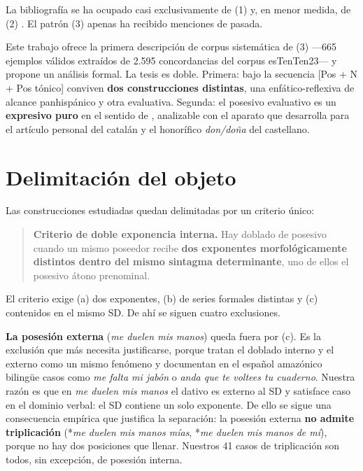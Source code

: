 \documentclass[12pt,a4paper]{article}
\begin{document}
La bibliografía se ha ocupado casi exclusivamente de (1) y, en menor medida, de (2) \parencite{companycompany1994,companycompany1995,companycompany2001,companycompanyhuertaflores2017,granda1997,picallorigau1999,godenzzi2010,huertaflores2009,eguren2016,eguren2017b,rodriguezmondonedofafulas2016,rae2009}. El patrón (3) apenas ha recibido menciones de pasada.

Este trabajo ofrece la primera descripción de corpus sistemática de (3) ---665 ejemplos válidos extraídos de 2.595 concordancias del corpus esTenTen23--- y propone un análisis formal. La tesis es doble. Primera: bajo la secuencia [Pos + N + Pos tónico] conviven \textbf{dos construcciones distintas}, una enfático-reflexiva de alcance panhispánico y otra evaluativa. Segunda: el posesivo evaluativo es un \textbf{expresivo puro} en el sentido de \textcite{potts2005}, analizable con el aparato que \textcite{saab2021} desarrolla para el artículo personal del catalán y el honorífico \textit{don/doña} del castellano.

\section{Delimitación del objeto}

Las construcciones estudiadas quedan delimitadas por un criterio único:

\begin{quote}
\textbf{Criterio de doble exponencia interna.} Hay doblado de posesivo cuando un mismo poseedor recibe \textbf{dos exponentes morfológicamente distintos dentro del mismo sintagma determinante}, uno de ellos el posesivo átono prenominal.
\end{quote}

El criterio exige (a) dos exponentes, (b) de series formales distintas y (c) contenidos en el mismo SD. De ahí se siguen cuatro exclusiones.

\textbf{La posesión externa} (\textit{me duelen mis manos}) queda fuera por (c). Es la exclusión que más necesita justificarse, porque \textcite{rodriguezmondonedofafulas2016} tratan el doblado interno y el externo como un mismo fenómeno y documentan en el español amazónico bilingüe casos como \textit{me falta mi jabón} o \textit{anda que te voltees tu cuaderno}. Nuestra razón es que en \textit{me duelen mis manos} el dativo es externo al SD y satisface caso en el dominio verbal: el SD contiene un solo exponente. De ello se sigue una consecuencia empírica que justifica la separación: la posesión externa \textbf{no admite triplicación} (*\textit{me duelen mis manos mías}, *\textit{me duelen mis manos de mí}), porque no hay dos posiciones que llenar. Nuestros 41 casos de triplicación son todos, sin excepción, de posesión interna.
\end{document}
